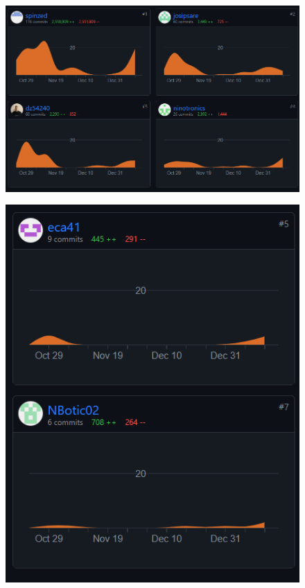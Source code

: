 		
			\begin{figure}[H]
			\includegraphics[scale=0.7]{slike/aktivnost1.PNG} %
			\centering
			\label{fig:dodatak}
		\end{figure}
		
		\begin{figure}[H]
			\includegraphics[scale=0.7]{slike/aktivnost2.PNG} %
			\centering
			\label{fig:dodatak}
		\end{figure}
		
	